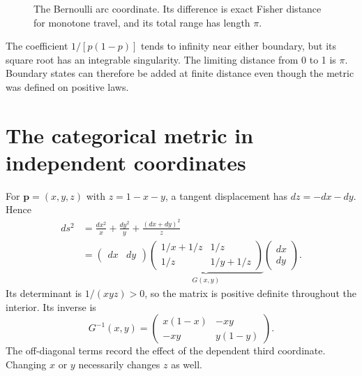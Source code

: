\documentclass[11pt,oneside,openany]{book}
\theoremstyle{definition}
\theoremstyle{remark}
\newcommand{\p}{\mathbf{p}}
\numberwithin{equation}{chapter}
\begin{document}
\begin{figure}[htbp]
\centering
{}
\caption{The Bernoulli arc coordinate. Its difference is exact Fisher distance for monotone travel, and its total range has length $\pi$.}
\end{figure}

The coefficient $1/[p(1-p)]$ tends to infinity near either boundary, but its square root has an integrable singularity. The limiting distance from 0 to 1 is $\pi$. Boundary states can therefore be added at finite distance even though the metric was defined on positive laws.

\section{The categorical metric in independent coordinates}
For $\p=(x,y,z)$ with $z=1-x-y$, a tangent displacement has $dz=-dx-dy$. Hence
\begin{align*}
ds^2&=\frac{dx^2}{x}+\frac{dy^2}{y}+\frac{(dx+dy)^2}{z}\\
&=\begin{pmatrix}dx&dy\end{pmatrix}
\underbrace{\begin{pmatrix}1/x+1/z&1/z\\1/z&1/y+1/z\end{pmatrix}}_{G(x,y)}
\begin{pmatrix}dx\\dy\end{pmatrix}.
\end{align*}
Its determinant is $1/(xyz)>0$, so the matrix is positive definite throughout the interior. Its inverse is
\begin{equation}\label{eq:inversefisher}
G^{-1}(x,y)=\begin{pmatrix}x(1-x)&-xy\\-xy&y(1-y)\end{pmatrix}.
\end{equation}
The off-diagonal terms record the effect of the dependent third coordinate. Changing $x$ or $y$ necessarily changes $z$ as well.
\end{document}
